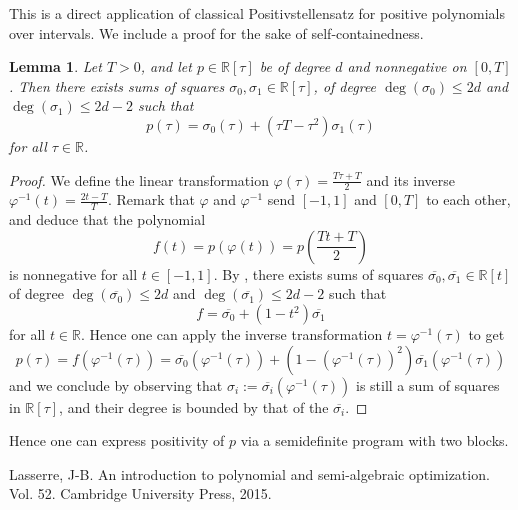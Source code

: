 \documentclass[a4paper,12pt,english]{amsart}
\newcommand\mbb{\mathbb}
\newcommand\RR{\mbb{R}}
\numberwithin{equation}{section}
\theoremstyle{remark}
\theoremstyle{plain}
\newtheorem{lem}[equation]{Lemma}
\theoremstyle{definition}
\begin{document}
\newpage
This is a direct application of classical Positivstellensatz for positive polynomials
over intervals. We include a proof for the sake of self-containedness.
\begin{lem}
  Let $T>0$, and let $p \in \RR[\tau]$ be of degree $d$ and nonnegative on
  $[0,T]$. Then there exists sums of squares $\sigma_0,\sigma_1 \in \RR[\tau]$, of
  degree $\deg(\sigma_0) \leq 2d$ and $\deg(\sigma_1) \leq 2d-2$ such that
  $$
  p(\tau) = \sigma_0(\tau)+\left( \tau T - \tau^2 \right)\sigma_1(\tau)
  $$
  for all $\tau \in \RR$.
\end{lem}
\begin{proof}
  We define the linear transformation $\varphi(\tau)=\frac{T\tau+T}{2}$ and its inverse
  $\varphi^{-1}(t)=\frac{2t-T}{T}$. Remark that $\varphi$ and $\varphi^{-1}$ send $[-1,1]$
  and $[0,T]$ to each other, and deduce that the polynomial
  $$
  f(t)=p(\varphi(t)) = p\left(\frac{Tt+T}{2}\right)
  $$
  is nonnegative for all $t \in [-1,1]$. By \cite[Th.2.4(a)]{lasserre}, there exists
  sums of squares $\overline{\sigma_0},\overline{\sigma_1} \in \RR[t]$ of degree
  $\deg(\overline{\sigma_0}) \leq 2d$ and $\deg(\overline{\sigma_1}) \leq 2d-2$ such that
  $$
  f = \overline{\sigma_0}+(1-t^2)\overline{\sigma_1}
  $$
  for all $t \in \RR$. Hence one can apply the inverse transformation
  $t=\varphi^{-1}(\tau)$ to get
  $$
  p(\tau) = f(\varphi^{-1}(\tau)) = \overline{\sigma_0}(\varphi^{-1}(\tau))+(1-(\varphi^{-1}(\tau))^2)\overline{\sigma_1}(\varphi^{-1}(\tau))
  $$
  and we conclude by observing that $\sigma_i:=\overline{\sigma_i}(\varphi^{-1}(\tau))$
  is still a sum of squares in $\RR[\tau]$, and their degree is bounded by that of
  the $\overline{\sigma_i}$.
\end{proof}

Hence one can express positivity of $p$ via a semidefinite program with two blocks.

\begin{thebibliography}{9}
Lasserre, J-B. An introduction to polynomial and semi-algebraic optimization. Vol. 52. Cambridge University Press, 2015.
\end{thebibliography}
\end{document}

